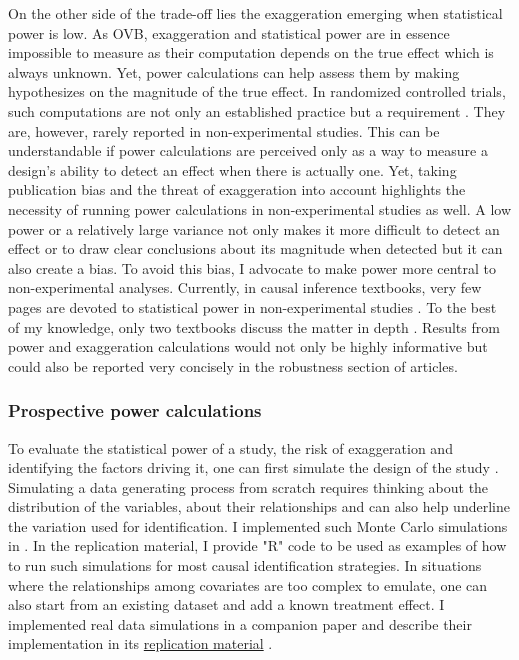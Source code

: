 \documentclass[usletter, 12pt]{article}
\begin{document}
			On the other side of the trade-off lies the exaggeration emerging when statistical power is low. As OVB, exaggeration and statistical power are in essence impossible to measure as their computation depends on the true effect which is always unknown. Yet, power calculations can help assess them by making hypothesizes on the magnitude of the true effect. In randomized controlled trials, such computations are not only an established practice but a requirement \citep{duflo_using_2007, mcconnell_going_2015, athey_econometrics_2016}. They are, however, rarely reported in non-experimental studies. This can be understandable if power calculations are perceived only as a way to measure a design's ability to detect an effect when there is actually one. Yet, taking publication bias and the threat of exaggeration into account highlights the necessity of running power calculations in non-experimental studies as well. A low power or a relatively large variance not only makes it more difficult to detect an effect or to draw clear conclusions about its magnitude when detected but it can also create a bias. To avoid this bias, I advocate to make power more central to non-experimental analyses. Currently, in causal inference textbooks, very few pages are devoted to statistical power in non-experimental studies \citep{angrist_mostly_2009, angrist_mastering_2014, imbens_causal_2015, cunningham_causal_2021}. To the best of my knowledge, only two textbooks discuss the matter in depth \citep{shadish_experimental_2002, huntington-klein_effect_2021}. Results from power and exaggeration calculations would not only be highly informative but could also be reported very concisely in the robustness section of articles. 
			
			\subsubsection{Prospective power calculations}
						
				To evaluate the statistical power of a study, the risk of exaggeration and identifying the factors driving it, one can first simulate the design of the study \citep{hill_bayesian_2011, gelman_regression_2020, black_simulated_2021}. Simulating a data generating process from scratch requires thinking about the distribution of the variables, about their relationships and can also help underline the variation used for identification. %
			 I implemented such Monte Carlo simulations in . In the replication material, I provide "R" code to be used as examples of how to run such simulations for most causal identification strategies. In situations where the relationships among covariates are too complex to emulate, one can also start from an existing dataset and add a known treatment effect. I implemented real data simulations in a companion paper and describe their implementation in its \href{https://vincentbagilet.github.io/inference_pollution/}{replication material} \citep{bagilet_accurately_2023}. 
			 
\end{document}
